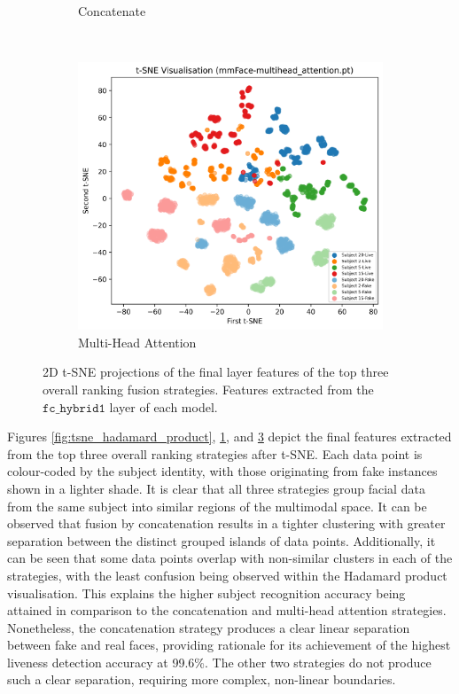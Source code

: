 \documentclass{mpaper}
\begin{document}
\begin{figure}[!t]
\begin{subfigure}[b]{0.32\textwidth}
        \caption{Concatenate}
        \label{fig:tsne_concatenate}
    \end{subfigure}
    ~\hspace{0.01cm}
    \begin{subfigure}[b]{0.32\textwidth}
        \includegraphics[width=1.06\textwidth]{figures/tsne_multihead_attention.png}
        \caption{Multi-Head Attention}
        \label{fig:tsne_multihead_attention}
    \end{subfigure}
    \vspace{0.3cm}
    \caption{2D t-SNE projections of the final layer features of the top three overall ranking fusion strategies. Features extracted from the $\mathtt{fc\_hybrid1}$ layer of each model.}
\end{figure}

Figures \ref{fig:tsne_hadamard_product}, \ref{fig:tsne_concatenate}, and \ref{fig:tsne_multihead_attention} depict the final features extracted from the top three overall ranking strategies after t-SNE. Each data point is colour-coded by the subject identity, with those originating from fake instances shown in a lighter shade. It is clear that all three strategies group facial data from the same subject into similar regions of the multimodal space. It can be observed that fusion by concatenation results in a tighter clustering with greater separation between the distinct grouped islands of data points. Additionally, it can be seen that some data points overlap with non-similar clusters in each of the strategies, with the least confusion being observed within the Hadamard product visualisation. This explains the higher subject recognition accuracy being attained in comparison to the concatenation and multi-head attention strategies. Nonetheless, the concatenation strategy produces a clear linear separation between fake and real faces, providing rationale for its achievement of the highest liveness detection accuracy at 99.6\%. The other two strategies do not produce such a clear separation, requiring more complex, non-linear boundaries.
\end{document}
